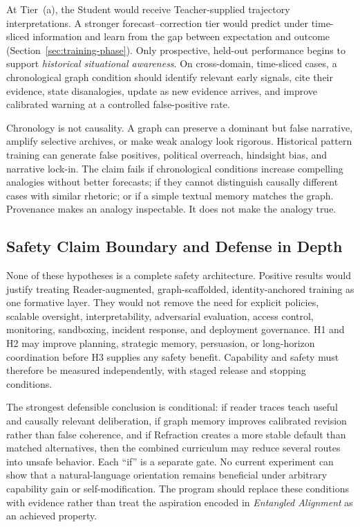 At Tier~(a), the Student would receive Teacher-supplied trajectory
interpretations. A stronger forecast--correction tier would predict under
time-sliced information and learn from the gap between expectation and outcome
(Section~\ref{sec:training-phase}). Only prospective, held-out performance
begins to support \emph{historical situational awareness}. On cross-domain,
time-sliced cases, a chronological graph condition should identify relevant
early signals, cite their evidence, state disanalogies, update as new evidence
arrives, and improve calibrated warning at a controlled false-positive rate.

Chronology is not causality. A graph can preserve a dominant but false
narrative, amplify selective archives, or make weak analogy look rigorous.
Historical pattern training can generate false positives, political overreach,
hindsight bias, and narrative lock-in. The claim fails if chronological
conditions increase compelling analogies without better forecasts; if they
cannot distinguish causally different cases with similar rhetoric; or if a
simple textual memory matches the graph. Provenance makes an analogy
inspectable. It does not make the analogy true.

\subsection{Safety Claim Boundary and Defense in Depth}

None of these hypotheses is a complete safety architecture. Positive results
would justify treating Reader-augmented, graph-scaffolded, identity-anchored
training as one formative layer. They would not remove the need for explicit
policies, scalable oversight, interpretability, adversarial evaluation, access
control, monitoring, sandboxing, incident response, and deployment governance.
H1 and H2 may improve planning, strategic memory, persuasion, or long-horizon
coordination before H3 supplies any safety benefit. Capability and safety must
therefore be measured independently, with staged release and stopping
conditions.

The strongest defensible conclusion is conditional: if reader traces teach
useful and causally relevant deliberation, if graph memory improves calibrated
revision rather than false coherence, and if Refraction creates a more stable
default than matched alternatives, then the combined curriculum may reduce
several routes into unsafe behavior. Each ``if'' is a separate gate. No current
experiment can show that a natural-language orientation remains beneficial
under arbitrary capability gain or self-modification. The program should
replace these conditions with evidence rather than treat the aspiration encoded
in \emph{Entangled Alignment} as an achieved property.

